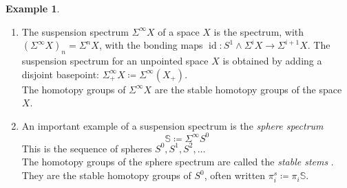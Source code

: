 \documentclass[notitlepage,12pt]{article}
\theoremstyle{definition}
\newtheorem{example}[theorem]{Example}
\theoremstyle{para}{\normalfont}
\begin{document}
\begin{example}
    \begin{enumerate}
    \item The suspension spectrum $\Sigma^{\infty } X$ of a space $X$ is the spectrum, with $(\Sigma^{\infty } X)_n=\Sigma^nX$, with the bonding maps $\operatorname*{id }:S^1\wedge \Sigma^iX\to \Sigma^{i+1 } X$. The suspension spectrum for an unpointed space $X$ is obtained by adding a disjoint basepoint: $\Sigma^{\infty } _+X\coloneqq \Sigma^{\infty } (X_+)$. \\
    The homotopy groups of $\Sigma^{\infty } X$ are the stable homotopy groups of the space $X$. 
        \item An important example of a suspension spectrum is the \textit{sphere spectrum} $$\mathbb{S}\coloneqq \Sigma^{\infty } S^0$$ This is the sequence of spheres $S^0,S^1,S^2,\dots$ \\
        The homotopy groups of the sphere spectrum are called the \textit{stable stems }. They are the stable homotopy groups of $S^0$, often written $\pi_i^s\coloneqq \pi_i \mathbb{S}$. 
    \end{enumerate}
\end{example}
\end{document}
